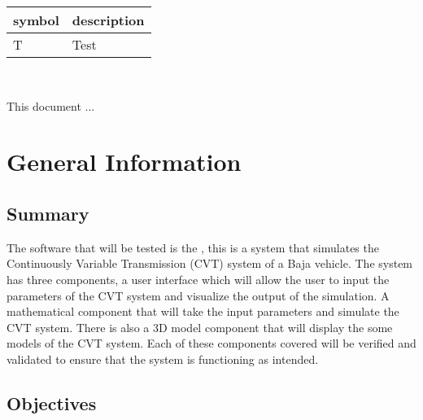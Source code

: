 \documentclass[12pt, titlepage]{article}
\begin{document}
\renewcommand{\arraystretch}{1.2}
\begin{tabular}{l l} 
  \toprule		
  \textbf{symbol} & \textbf{description}\\
  \midrule 
  T & Test\\
  \bottomrule
\end{tabular}\\



\newpage


This document ... 

\section{General Information}

\subsection{Summary}

The software that will be tested is the \progname{}, this is a system that simulates the Continuously Variable Transmission (CVT) system of a Baja vehicle.
The system has three components, a user interface which will allow the user to input the parameters of the CVT system and visualize the output of the simulation.
A mathematical component that will take the input parameters and simulate the CVT system.
There is also a 3D model component that will display the some models of the CVT system. 
Each of these components covered will be verified and validated to ensure that the system is functioning as intended.

\subsection{Objectives}

\end{document}
